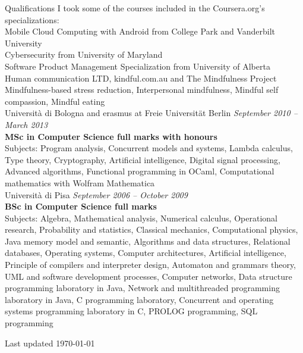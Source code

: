 \documentclass{resume}
\begin{document}
	\begin{rSection}{Qualifications} 
		I took some of the courses included in the Coursera.org's  specializations:\\
		Mobile Cloud Computing with Android from College Park and Vanderbilt University\\
		Cybersecurity from University of Maryland\\
		Software Product Management Specialization from University of Alberta\\
		
		Human communication LTD, kindful.com.au and The Mindfulness Project\hfill \\
		Mindfulness-based stress reduction,
		Interpersonal mindfulness,
		Mindful self compassion, 
		Mindful eating\\
		
		Universit\`a di Bologna and erasmus at Freie Universit\"at Berlin \hfill {\em September 2010 -- March 2013} \\
		{\bf MSc in Computer Science full marks with honours}\\
		Subjects:
		Program analysis, Concurrent models and systems, Lambda calculus,
		Type theory, Cryptography, Artificial intelligence, Digital signal processing,
		Advanced algorithms, Functional programming in OCaml, Computational mathematics with Wolfram Mathematica\\

		Universit\`a di Pisa \hfill {\em September 2006 -- October 2009} \\
		{\bf BSc in Computer Science full marks}\\
		Subjects: 
		Algebra, Mathematical analysis, Numerical calculus, Operational research,
		Probability and statistics, Classical mechanics, Computational physics,
		Java memory model and semantic, Algorithms and data structures, Relational databases,
		Operating systems, Computer architectures, Artificial intelligence, Principle of compilers and interpreter design,
		Automaton and grammars theory, UML and software development processes, Computer networks,
		Data structure programming laboratory in Java, Network and multithreaded programming laboratory in Java,
		C programming laboratory, Concurrent and operating systems programming laboratory in C,
		PROLOG programming, SQL programming
	\end{rSection}
	Last updated \today 
\end{document}
